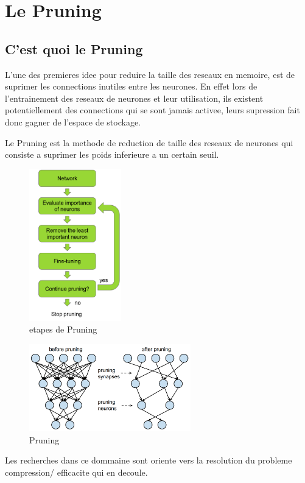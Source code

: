 \documentclass[twoside,twocolumn]{article}
\begin{document}
\section{Le Pruning} %

\subsection{C'est quoi le Pruning}
L'une des premieres idee pour reduire la taille des reseaux en memoire, est de suprimer les connections inutiles entre les neurones.
En effet lors de l'entrainement des reseaux de neurones et leur utilisation, ils existent potentiellement des connections qui se sont jamais 
activee, leurs supression  fait donc gagner de l'espace de stockage.

Le Pruning est la methode de reduction de taille des reseaux de neurones qui consiste a suprimer les poids inferieure a un certain seuil.

\begin{figure}[h]
  \centering
  \includegraphics[width=40mm]{pruning_steps.png}
  \caption{etapes de Pruning}
  \label{Pruning_step}
\end{figure}

\begin{figure}[h]
  \centering
  \includegraphics[width=70mm]{pruning.png}
  \caption{Pruning}
  \label{pruning du perceptron Multicouche}
\end{figure}
Les recherches dans ce dommaine sont oriente vers la resolution du probleme compression/ efficacite qui en decoule. 
\end{document}
